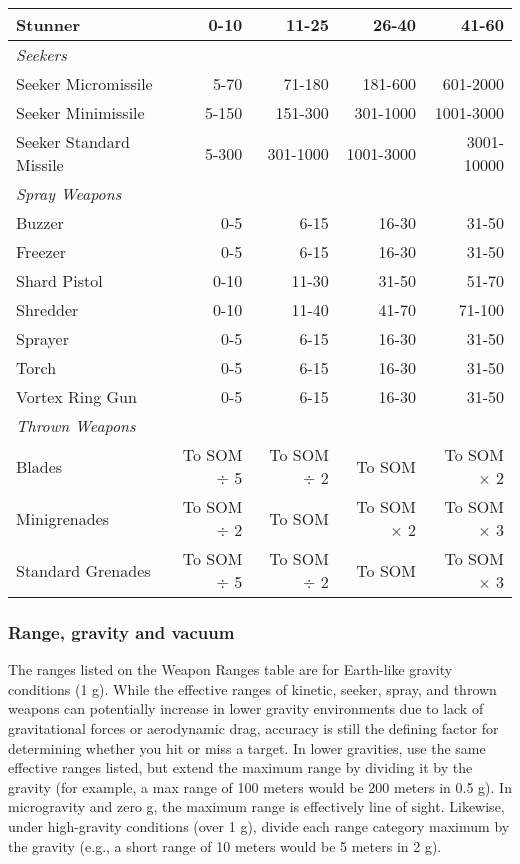 \begin{table}
\begin{tabularx}{\textwidth}{|X|r|r|r|r|}
\hline
Stunner				& 0-10	& 11-25	& 26-40	& 41-60 \\
\hline
\multicolumn{5}{|l|}{\emph{Seekers}} \\
\hline
Seeker Micromissile		& 5-70	& 71-180		& 181-600		& 601-2000 \\
\hline
Seeker Minimissile		& 5-150	& 151-300		& 301-1000	& 1001-3000 \\
\hline
Seeker Standard Missile	& 5-300	& 301-1000	& 1001-3000	& 3001-10000 \\
\hline
\multicolumn{5}{|l|}{\emph{Spray Weapons}} \\
\hline
Buzzer			& 0-5	& 6-15	& 16-30	& 31-50\\
\hline
Freezer			& 0-5	& 6-15	& 16-30	& 31-50\\
\hline
Shard Pistol		& 0-10	& 11-30	& 31-50	& 51-70\\
\hline
Shredder		& 0-10	& 11-40	& 41-70	& 71-100\\
\hline
Sprayer			& 0-5	& 6-15	& 16-30	& 31-50\\
\hline
Torch			& 0-5	& 6-15	& 16-30	& 31-50\\
\hline
Vortex Ring Gun	& 0-5	& 6-15	& 16-30	& 31-50\\
\hline
\multicolumn{5}{|l|}{\emph{Thrown Weapons}} \\
\hline
Blades 			& To SOM $\div$ 5 	& To SOM $\div$ 2 	& To SOM 		& To SOM $\times$ 2 \\
\hline
Minigrenades 	& To SOM $\div$ 2 	& To SOM 			& To SOM $\times$ 2 	& To SOM $\times$ 3 \\
\hline
Standard Grenades & To SOM $\div$ 5 	& To SOM $\div$ 2 	& To SOM 		& To SOM $\times$ 3 \\
\hline
\end{tabularx}
\end{table}


\subsubsection{Range, gravity and vacuum}

The ranges listed on the Weapon Ranges table are for Earth-like gravity conditions (1 g). While the effective ranges of kinetic, seeker, spray, and thrown weapons can potentially increase in lower gravity environments due to lack of gravitational forces or aerodynamic drag, accuracy is still the defining factor for determining whether you hit or miss a target. In lower gravities, use the same effective ranges listed, but extend the maximum range by dividing it by the gravity (for example, a max range of 100 meters would be 200 meters in 0.5 g). In microgravity and zero g, the maximum range is effectively line of sight. Likewise, under high-gravity conditions (over 1 g), divide each range category maximum by the gravity (e.g., a short range of 10 meters would be 5 meters in 2 g).

